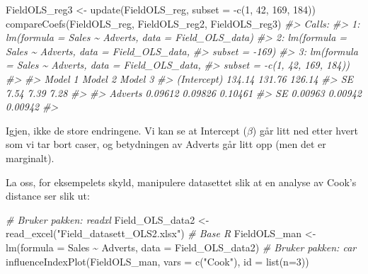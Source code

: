 \documentclass[
]{article}
\newenvironment{Shaded}{\begin{snugshade}}{\end{snugshade}}
\newcommand{\AttributeTok}[1]{\textcolor[rgb]{0.77,0.63,0.00}{#1}}
\newcommand{\CommentTok}[1]{\textcolor[rgb]{0.56,0.35,0.01}{\textit{#1}}}
\newcommand{\DecValTok}[1]{\textcolor[rgb]{0.00,0.00,0.81}{#1}}
\newcommand{\FunctionTok}[1]{\textcolor[rgb]{0.00,0.00,0.00}{#1}}
\newcommand{\NormalTok}[1]{#1}
\newcommand{\OtherTok}[1]{\textcolor[rgb]{0.56,0.35,0.01}{#1}}
\newcommand{\SpecialCharTok}[1]{\textcolor[rgb]{0.00,0.00,0.00}{#1}}
\newcommand{\StringTok}[1]{\textcolor[rgb]{0.31,0.60,0.02}{#1}}
\begin{document}
\begin{Shaded}
\begin{Highlighting}[]
\NormalTok{FieldOLS\_reg3 }\OtherTok{\textless{}{-}} \FunctionTok{update}\NormalTok{(FieldOLS\_reg, }\AttributeTok{subset =} \SpecialCharTok{{-}}\FunctionTok{c}\NormalTok{(}\DecValTok{1}\NormalTok{, }\DecValTok{42}\NormalTok{, }\DecValTok{169}\NormalTok{, }\DecValTok{184}\NormalTok{))}
\FunctionTok{compareCoefs}\NormalTok{(FieldOLS\_reg, FieldOLS\_reg2, FieldOLS\_reg3)}
\CommentTok{\#\textgreater{} Calls:}
\CommentTok{\#\textgreater{} 1: lm(formula = Sales \textasciitilde{} Adverts, data = Field\_OLS\_data)}
\CommentTok{\#\textgreater{} 2: lm(formula = Sales \textasciitilde{} Adverts, data = Field\_OLS\_data, }
\CommentTok{\#\textgreater{}   subset = {-}169)}
\CommentTok{\#\textgreater{} 3: lm(formula = Sales \textasciitilde{} Adverts, data = Field\_OLS\_data, }
\CommentTok{\#\textgreater{}   subset = {-}c(1, 42, 169, 184))}
\CommentTok{\#\textgreater{} }
\CommentTok{\#\textgreater{}             Model 1 Model 2 Model 3}
\CommentTok{\#\textgreater{} (Intercept)  134.14  131.76  126.14}
\CommentTok{\#\textgreater{} SE             7.54    7.39    7.28}
\CommentTok{\#\textgreater{}                                    }
\CommentTok{\#\textgreater{} Adverts     0.09612 0.09826 0.10461}
\CommentTok{\#\textgreater{} SE          0.00963 0.00942 0.00942}
\CommentTok{\#\textgreater{} }
\end{Highlighting}
\end{Shaded}

Igjen, ikke de store endringene. Vi kan se at Intercept (\(\beta\)) går litt ned etter hvert som vi tar bort caser, og betydningen av Adverts går litt opp (men det er marginalt).

La oss, for eksempelets skyld, manipulere datasettet slik at en analyse av Cook's distance ser slik ut:

\begin{Shaded}
\begin{Highlighting}[]
\CommentTok{\# Bruker pakken: readxl}
\NormalTok{Field\_OLS\_data2 }\OtherTok{\textless{}{-}} \FunctionTok{read\_excel}\NormalTok{(}\StringTok{"Field\_datasett\_OLS2.xlsx"}\NormalTok{)}
\CommentTok{\# Base R}
\NormalTok{FieldOLS\_man }\OtherTok{\textless{}{-}} \FunctionTok{lm}\NormalTok{(}\AttributeTok{formula =}\NormalTok{ Sales }\SpecialCharTok{\textasciitilde{}}\NormalTok{ Adverts, }\AttributeTok{data =}\NormalTok{ Field\_OLS\_data2)}
\CommentTok{\# Bruker pakken: car}
\FunctionTok{influenceIndexPlot}\NormalTok{(FieldOLS\_man, }\AttributeTok{vars =} \FunctionTok{c}\NormalTok{(}\StringTok{"Cook"}\NormalTok{), }\AttributeTok{id =} \FunctionTok{list}\NormalTok{(}\AttributeTok{n=}\DecValTok{3}\NormalTok{))}
\end{Highlighting}
\end{Shaded}
\end{document}
